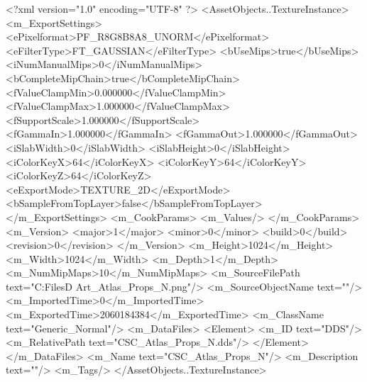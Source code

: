 <?xml version="1.0" encoding="UTF-8" ?>
<AssetObjects..TextureInstance>
	<m_ExportSettings>
		<ePixelformat>PF_R8G8B8A8_UNORM</ePixelformat>
		<eFilterType>FT_GAUSSIAN</eFilterType>
		<bUseMips>true</bUseMips>
		<iNumManualMips>0</iNumManualMips>
		<bCompleteMipChain>true</bCompleteMipChain>
		<fValueClampMin>0.000000</fValueClampMin>
		<fValueClampMax>1.000000</fValueClampMax>
		<fSupportScale>1.000000</fSupportScale>
		<fGammaIn>1.000000</fGammaIn>
		<fGammaOut>1.000000</fGammaOut>
		<iSlabWidth>0</iSlabWidth>
		<iSlabHeight>0</iSlabHeight>
		<iColorKeyX>64</iColorKeyX>
		<iColorKeyY>64</iColorKeyY>
		<iColorKeyZ>64</iColorKeyZ>
		<eExportMode>TEXTURE_2D</eExportMode>
		<bSampleFromTopLayer>false</bSampleFromTopLayer>
	</m_ExportSettings>
	<m_CookParams>
		<m_Values/>
	</m_CookParams>
	<m_Version>
		<major>1</major>
		<minor>0</minor>
		<build>0</build>
		<revision>0</revision>
	</m_Version>
	<m_Height>1024</m_Height>
	<m_Width>1024</m_Width>
	<m_Depth>1</m_Depth>
	<m_NumMipMaps>10</m_NumMipMaps>
	<m_SourceFilePath text="C:\Users\Shadow\Desktop\Working Files\3D Art\Textures\CSC_Atlas_Props_N.png"/>
	<m_SourceObjectName text=""/>
	<m_ImportedTime>0</m_ImportedTime>
	<m_ExportedTime>2060184384</m_ExportedTime>
	<m_ClassName text="Generic_Normal"/>
	<m_DataFiles>
		<Element>
			<m_ID text="DDS"/>
			<m_RelativePath text="CSC_Atlas_Props_N.dds"/>
		</Element>
	</m_DataFiles>
	<m_Name text="CSC_Atlas_Props_N"/>
	<m_Description text=""/>
	<m_Tags/>
</AssetObjects..TextureInstance>

